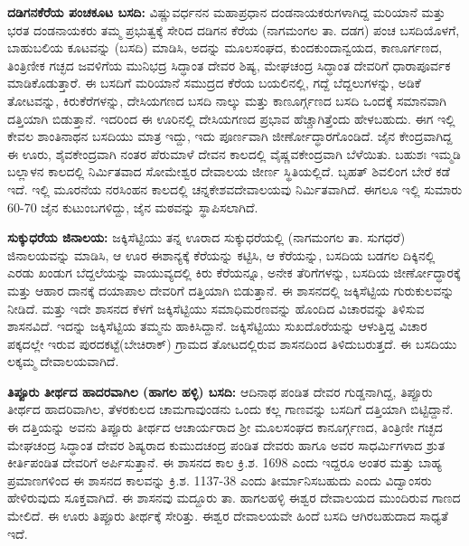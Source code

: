 \textbf{ದಡಿಗನಕೆರೆಯ ಪಂಚಕೂಟ ಬಸದಿ:} ವಿಷ್ಣುವರ್ಧನನ ಮಹಾಪ್ರಧಾನ ದಂಡನಾಯಕರು\-ಗಳಾಗಿದ್ದ ಮರಿಯಾನೆ ಮತ್ತು ಭರತ ದಂಡನಾಯಕರು ತಮ್ಮ ಪ್ರಭುತ್ವಕ್ಕೆ ಸೇರಿದ ದಡಿಗನ ಕೆರೆಯ (ನಾಗಮಂಗಲ ತಾ. ದಡಗ) ಪಂಚ ಬಸದಿಯೊಳಗೆ, ಬಾಹುಬಲಿಯ ಕೂಟವನ್ನು (ಬಸದಿ) ಮಾಡಿಸಿ, ಅದನ್ನು ಮೂಲಸಂಘದ, ಕುಂದಕುಂದಾನ್ವಯದ, ಕಾಣೂರ್ಗಣದ, ತಿಂತ್ರಿಣೀಕ ಗಚ್ಛದ ಜವಳಿಗೆಯ ಮುನಿಭದ್ರ ಸಿದ್ಧಾಂತ ದೇವರ ಶಿಷ್ಯ, ಮೇಘಚಂದ್ರ ಸಿದ್ಧಾಂತ ದೇವರಿಗೆ ಧಾರಾಪೂರ್ವಕ ಮಾಡಿಕೊಡುತ್ತಾರೆ. ಈ ಬಸದಿಗೆ ಮರಿಯಾನೆ ಸಮುದ್ರದ ಕೆರೆಯ ಬಯಲಿನಲ್ಲಿ, ಗದ್ದೆ ಬೆದ್ದಲುಗಳನ್ನು, ಅಡಿಕೆ ತೋಟವನ್ನು, ಕಿರುಕೆರೆಗಳನ್ನು, ದೇಸಿಯಗಣದ ಬಸದಿ ನಾಲ್ಕು ಮತ್ತು ಕಾಣೂರ್ಗ್ಗಣದ ಬಸದಿ ಒಂದಕ್ಕೆ ಸಮಾನವಾಗಿ ದತ್ತಿಯಾಗಿ ಬಿಡುತ್ತಾನೆ. ಇದರಿಂದ ಈ ಊರಿನಲ್ಲಿ ದೇಸಿಯಗಣದ ಪ್ರಭಾವ ಹೆಚ್ಚಾಗಿತ್ತೆಂದು ಹೇಳಬಹುದು. ಈಗ ಇಲ್ಲಿ ಕೇವಲ ಶಾಂತಿನಾಥನ ಬಸದಿಯು ಮಾತ್ರ ಇದ್ದು, ಇದು ಪೂರ್ಣವಾಗಿ ಜೀರ್ಣೋದ್ಧಾರಗೊಂಡಿದೆ. ಜೈನ ಕೇಂದ್ರವಾಗಿದ್ದ ಈ ಊರು, ಶೈವಕೇಂದ್ರವಾಗಿ ನಂತರ ಪೆರುಮಾಳೆ ದೇವನ ಕಾಲದಲ್ಲಿ ವೈಷ್ಣವಕೇಂದ್ರವಾಗಿ ಬೆಳೆಯಿತು. ಬಹುಶಃ ಇಮ್ಮಡಿ ಬಲ್ಲಾಳನ ಕಾಲದಲ್ಲಿ ನಿರ್ಮಿತವಾದ ಸೋಮೇಶ್ವರ ದೇವಾಲಯ ಜೀರ್ಣ ಸ್ಥಿತಿಯಲ್ಲಿದೆ. ಬೃಹತ್ ಶಿವಲಿಂಗ ಬೇರೆ ಕಡೆ ಇದೆ. ಇಲ್ಲಿ ಮೂರನೆಯ ನರಸಿಂಹನ ಕಾಲದಲ್ಲಿ ಚನ್ನಕೇಶವದೇವಾಲಯವು ನಿರ್ಮಿತವಾಗಿದೆ. ಈಗಲೂ ಇಲ್ಲಿ ಸುಮಾರು 60-70 ಜೈನ ಕುಟುಂಬಗಳಿದ್ದು, ಜೈನ ಮಠವನ್ನು ಸ್ಥಾಪಿಸಲಾಗಿದೆ.

\vskip 3pt

\textbf{ಸುಕ್ಕುಧರೆಯ ಜಿನಾಲಯ:} ಜಕ್ಕಿಸೆಟ್ಟಿಯು ತನ್ನ ಊರಾದ ಸುಕ್ಕುಧರೆಯಲ್ಲಿ (ನಾಗಮಂಗಲ ತಾ. ಸುಗಧರೆ) ಜಿನಾಲಯವನ್ನು ಮಾಡಿಸಿ, ಆ ಊರ ಈಶಾನ್ಯಕ್ಕೆ ಕೆರೆಯನ್ನು ಕಟ್ಟಿಸಿ, ಆ ಕೆರೆಯನ್ನು, ಬಸದಿಯ ಬಡಗಲ ದಿಕ್ಕಿನಲ್ಲಿ ಎರಡು ಖಂಡುಗ ಬೆದ್ದಲೆಯನ್ನು ವಾಯುವ್ಯದಲ್ಲಿ ಕಿರು ಕೆರೆಯನ್ನೂ, ಅನೇಕ ತೆರಿಗೆಗಳನ್ನು, ಬಸದಿಯ ಜೀರ್ಣೋದ್ಧಾರಕ್ಕೆ ಮತ್ತು ಆಹಾರ ದಾನಕ್ಕೆ ದಯಾಪಾಲ ದೇವರಿಗೆ ದತ್ತಿಯಾಗಿ ಬಿಡುತ್ತಾನೆ. ಈ ಶಾಸನದಲ್ಲಿ ಜಕ್ಕಿಸೆಟ್ಟಿಯ ಗುರುಕುಲವನ್ನು ನೀಡಿದೆ. ಮತ್ತು ಇದೇ ಶಾಸನದ ಕೆಳಗೆ ಜಕ್ಕಿಸೆಟ್ಟಿಯು ಸಮಾಧಿಮರಣವನ್ನು ಹೊಂದಿದ ವಿಚಾರವನ್ನು ತಿಳಿಸುವ ಶಾಸನವಿದೆ. ಇದನ್ನು ಜಕ್ಕಿಸೆಟ್ಟಿಯ ತಮ್ಮನು ಹಾಕಿಸಿದ್ದಾನೆ. ಜಕ್ಕಿಸೆಟ್ಟಿಯು ಸುಖದೊರೆಯನ್ನು ಆಳುತ್ತಿದ್ದ ವಿಚಾರ ಪಕ್ಕದಲ್ಲೇ ಇರುವ ಪುರದಕಟ್ಟೆ(ಬೇಚಿರಾಕ್​) ಗ್ರಾಮದ ತೋಟದಲ್ಲಿರುವ ಶಾಸನದಿಂದ ತಿಳಿದುಬರುತ್ತದೆ. ಈ ಬಸದಿಯು ಲಕ್ಕಮ್ಮ ದೇವಾಲಯವಾಗಿದೆ.

\textbf{ತಿಪ್ಪೂರು ತೀರ್ಥದ ಹಾದರವಾಗಿಲ (ಹಾಗಲ ಹಳ್ಳಿ) ಬಸದಿ:} ಆದಿನಾಥ ಪಂಡಿತ ದೇವರ ಗುಡ್ಡನಾಗಿದ್ದ, ತಿಪ್ಪೂರು ತೀರ್ಥದ ಹಾದರಿವಾಗಿಲ, ತೆಳರಕುಲದ ಚಾಮಗಾವುಂಡನು ಒಂದು ಕಲ್ಲ ಗಾಣವನ್ನು ಬಸದಿಗೆ ದತ್ತಿಯಾಗಿ ಬಿಟ್ಟಿದ್ದಾನೆ. ಈ ದತ್ತಿಯನ್ನು ಅವನು ತಿಪ್ಪೂರು ತೀರ್ಥದ ಆಚಾರ್ಯರಾದ ಶ‍್ರೀ ಮೂಲಸಂಘದ ಕಾನೂರ್ಗ್ಗಣದ, ತಿಂತ್ರಿಣೀ ಗಚ್ಛದ ಮೇಘಚಂದ್ರ ಸಿದ್ಧಾಂತ ದೇವರ ಶಿಷ್ಯರಾದ ಕುಮುದಚಂದ್ರ ಪಂಡಿತ ದೇವರು ಹಾಗೂ ಅವರ ಸಾಧರ್ಮಿಗಳಾದ ಶ್ರುತ ಕೀರ್ತಿ\-ಪಂಡಿತ ದೇವರಿಗೆ ಅರ್ಪಿಸುತ್ತಾನೆ. ಈ ಶಾಸನದ ಕಾಲ ಕ್ರಿ.ಶ. 1698 ಎಂದು ಇದ್ದರೂ ಅಂತರ ಮತ್ತು ಬಾಹ್ಯ ಪ್ರಮಾಣಗಳಿಂದ ಈ ಶಾಸನದ ಕಾಲವನ್ನು ಕ್ರಿ.ಶ. 1137-38 ಎಂದು ತೀರ್ಮಾನಿಸಬಹುದು ಎಂದು ವಿದ್ವಾಂಸರು ಹೇಳಿರುವುದು ಸೂಕ್ತವಾಗಿದೆ. ಈ ಶಾಸನವು ಮದ್ದೂರು ತಾ. ಹಾಗಲಹಳ್ಳಿ ಈಶ್ವರ ದೇವಾಲಯದ ಮುಂದಿರುವ ಗಾಣದ ಮೇಲಿದೆ. ಈ ಊರು ತಿಪ್ಪೂರು ತೀರ್ಥಕ್ಕೆ ಸೇರಿತ್ತು. ಈಶ್ವರ ದೇವಾಲಯವೇ ಹಿಂದೆ ಬಸದಿ ಆಗಿರಬಹುದಾದ ಸಾಧ್ಯತೆ ಇದೆ.

